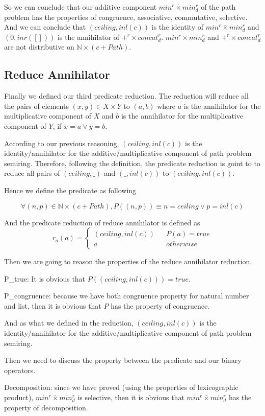 \documentclass[a4paper,10pt]{article}
\newcommand{\e}[2]{
\begin{equation}
  \label{#1} 
  #2
\end{equation}
}
\begin{document}
So we can conclude that our additive component $min^r \bar{\times} min^r_d$  of the path problem has the properties of congruence, associative, commutative, selective. And we can conclude that  $(ceiling,inl(c))$  is the identity of $min^r \bar{\times} min^r_d$ and $(0,inr([]))$ is the annihilator of $+^r \times concat^r_d$. $min^r \bar{\times} min^r_d$ and $+^r \times concat^r_d$ are not distributive on $\mathbb{N} \times (c + Path)$.
\subsection{Reduce Annihilator}
Finally we defined our third predicate reduction. The reduction will reduce all the pairs of elements $(x,y) \in X \times Y$ to $(a,b)$ where $a$ is the annihilator for the multiplicative component of $X$ and $b$ is the annihilator for the multiplicative component of $Y$, if $x = a \vee y = b$.

According to our previous reasoning, $(ceiling,inl (c))$ is the identity/annihilator for the additive/multiplicative component of path problem semiring. Therefore, following the definition, the predicate reduction is goint to to reduce all pairs of $(ceiling,\_)$ and $(\_,inl(c))$ to $(ceiling,inl(c))$.

Hence we define the predicate as following 
\e{pr:def:reduce_annihilator_p}{\forall (n,p) \in \mathbb{N} \times (c + Path), P((n,p)) \equiv n = ceiling \vee p = inl(c)}
And the predicate reduction of reduce annihilator is defined as \e{pr:def:reduce_annihilator_r}{r_a(a) = \left\{
\begin{aligned}
(ceiling,inl (c)) &  & P(a) = true \\
a &  & otherwise 
\end{aligned}
\right.}

Then we are going to reason the properties of the reduce annihilator reduction.

P\_true: It is obvious that $P((ceiling,inl (c))) = true$.

P\_congruence: because we have both congruence property for natural number and list, then it is obvious that $P$ has the property of congruence.

And as what we defined in the reduction, $(ceiling,inl (c))$ is the identity/annihilator for the additive/multiplicative component of path problem semiring.

Then we need to discuss the property between the predicate and our binary operators.

Decomposition: since we have proved (using the properties of lexicographic product), $min^r \bar{\times} min^r_d$ is selective, then it is obvious that $min^r \bar{\times} min^r_d$ has the property of decomposition.
\end{document}
